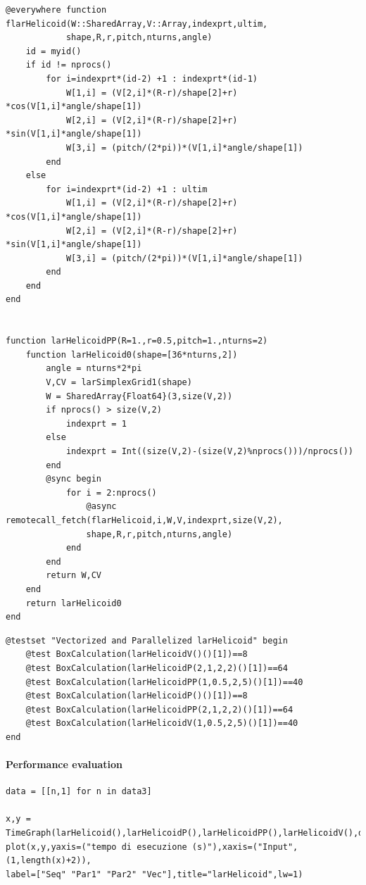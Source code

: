 \documentclass{article}
\begin{document}
\begin{Verbatim}
@everywhere function flarHelicoid(W::SharedArray,V::Array,indexprt,ultim,
            shape,R,r,pitch,nturns,angle)
    id = myid()
    if id != nprocs()
        for i=indexprt*(id-2) +1 : indexprt*(id-1)
            W[1,i] = (V[2,i]*(R-r)/shape[2]+r) *cos(V[1,i]*angle/shape[1])
            W[2,i] = (V[2,i]*(R-r)/shape[2]+r) *sin(V[1,i]*angle/shape[1])
            W[3,i] = (pitch/(2*pi))*(V[1,i]*angle/shape[1]) 
        end
    else
        for i=indexprt*(id-2) +1 : ultim
            W[1,i] = (V[2,i]*(R-r)/shape[2]+r) *cos(V[1,i]*angle/shape[1])
            W[2,i] = (V[2,i]*(R-r)/shape[2]+r) *sin(V[1,i]*angle/shape[1])
            W[3,i] = (pitch/(2*pi))*(V[1,i]*angle/shape[1])
        end
    end
end


function larHelicoidPP(R=1.,r=0.5,pitch=1.,nturns=2)
    function larHelicoid0(shape=[36*nturns,2])
        angle = nturns*2*pi
        V,CV = larSimplexGrid1(shape)
        W = SharedArray{Float64}(3,size(V,2))
        if nprocs() > size(V,2)
            indexprt = 1
        else
            indexprt = Int((size(V,2)-(size(V,2)%nprocs()))/nprocs())
        end
        @sync begin
            for i = 2:nprocs()
                @async remotecall_fetch(flarHelicoid,i,W,V,indexprt,size(V,2),
                shape,R,r,pitch,nturns,angle)
            end
        end
        return W,CV
    end
    return larHelicoid0    
end
\end{Verbatim}

\begin{Verbatim}
@testset "Vectorized and Parallelized larHelicoid" begin
    @test BoxCalculation(larHelicoidV()()[1])==8
    @test BoxCalculation(larHelicoidP(2,1,2,2)()[1])==64
    @test BoxCalculation(larHelicoidPP(1,0.5,2,5)()[1])==40
    @test BoxCalculation(larHelicoidP()()[1])==8
    @test BoxCalculation(larHelicoidPP(2,1,2,2)()[1])==64
    @test BoxCalculation(larHelicoidV(1,0.5,2,5)()[1])==40
end
\end{Verbatim}

\paragraph{Performance evaluation}

\begin{Verbatim}
data = [[n,1] for n in data3]

x,y = TimeGraph(larHelicoid(),larHelicoidP(),larHelicoidPP(),larHelicoidV(),data,5)
plot(x,y,yaxis=("tempo di esecuzione (s)"),xaxis=("Input",(1,length(x)+2)),
label=["Seq" "Par1" "Par2" "Vec"],title="larHelicoid",lw=1)

\end{Verbatim}
\end{document}
